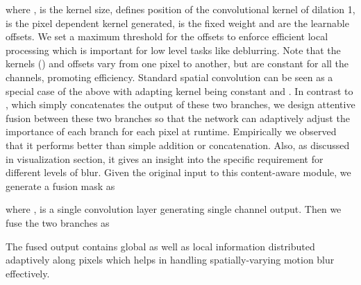 \documentclass[10pt,twocolumn,letterpaper]{article}
\begin{document}
where ,  is the kernel size,  defines position of the convolutional kernel of dilation 1,  is the pixel dependent kernel generated, is the fixed weight and  are the learnable offsets. We set a maximum threshold  for the offsets to enforce efficient local processing which is important for low level tasks like deblurring.  Note that the kernels () and offsets vary from one pixel to another, but are constant for all the channels, promoting efficiency. Standard spatial convolution can be seen as a special case of the above with adapting kernel being constant  and .
In contrast to \cite{bello2019attention}, which simply concatenates the output of these two branches, we design attentive fusion between these two branches so that the network can adaptively adjust the importance of each branch for each pixel at runtime. Empirically we observed that it performs better than simple addition or concatenation. Also, as discussed in visualization section, it gives an insight into the specific requirement for different levels of blur. Given the original input  to this content-aware module, we generate a fusion mask as

where ,  is a single convolution layer generating single channel output. Then we fuse the two branches as

The fused output  contains global as well as local information distributed adaptively along pixels which helps in handling spatially-varying motion blur effectively.
\end{document}
